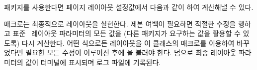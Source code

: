  패키지를 사용한다면 페이지 레이아웃 설정값에서
다음과 같이 하여 계산해낼 수 있다.
\begin{lcode}
\setlength{\textheight}{41\baselineskip + \topskip}
\end{lcode}

\cmd{\fixthelayout} 매크로는 최종적으로 레이아웃을 실현한다.
제본 여백이 필요하면 적절한 수정을 행하고 표준 \ltx\ 레이아웃 
파라미터의 모든 값을 (다른 패키지가 요구하는 값을
활용할 수 있도록) 다시 계산한다.
어떤 식으로든 레이아웃을 이 클래스의 매크로를 이용하여 바꾸었다면
필요한 모든 수정이 이루어진 후에 \cmd{\checkandfixthelayout}을 
불러야 한다. 덤으로 최종 레이아웃 파라미터의 값이 터미널에 표시되며
로그 파일에 기록된다.


